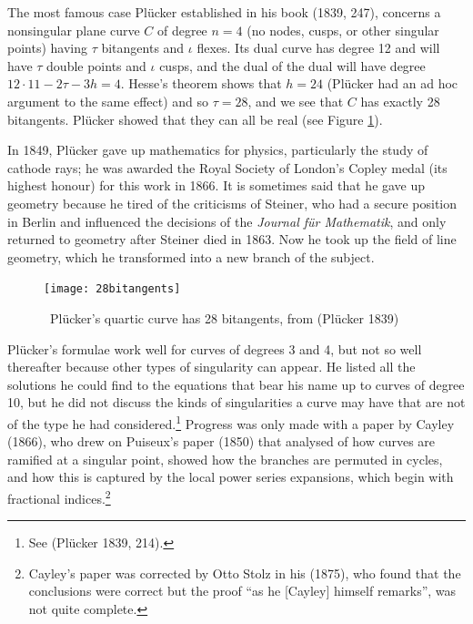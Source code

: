 The most famous case Pl\"ucker established in  his book (1839, 247),  concerns   a nonsingular plane curve $C$ of degree $n=4$  (no nodes, cusps, or other singular points) having $\tau$ bitangents and $\iota$ flexes.   Its dual curve has degree 12 and will have $\tau$ double points and $\iota$ cusps, and the dual of the dual will have degree 
$12\cdot 11 - 2\tau - 3h  = 4.$ 
Hesse's theorem shows that $h = 24$ (Pl\"ucker  had an ad hoc argument to the same effect)  and so $\tau = 28$,  and we  see that $C$ has exactly 28 bitangents. Pl\"ucker showed that they can all be real (see Figure \ref{fig28bitangents}).

In 1849, Pl\"ucker gave up mathematics for physics, particularly the study of cathode rays; he was awarded the Royal Society of London's Copley medal (its highest honour) for this work in 1866. It is sometimes said that he gave up geometry because he tired of the criticisms of Steiner, who had a secure position in Berlin and influenced the decisions of the \emph{Journal f\"ur Mathematik}, and only returned to geometry after Steiner died in 1863. Now he took up  the field of line geometry, which he transformed into a new branch of the subject. 

\bigskip

\begin{center} \label{28bitangents}
    \begin{figure}
   \begin{center}  \texttt{[image: 28bitangents]} 
   \end{center}
     \protect \caption{\, Pl\"ucker's quartic curve has 28 bitangents, from (Pl\"ucker 1839)}
      \label{fig28bitangents}
     \end{figure}
\end{center}
\bigskip

Pl\"ucker's formulae work well for curves of degrees 3 and 4,  but not so well thereafter because other types of singularity can appear.   He listed all the solutions he could find to the equations that bear his name up to curves of degree 10, but he did not discuss the kinds of singularities a curve may have that are not of the type he had considered.\footnote{See (Pl\"ucker 1839, 214).}  Progress was only made with a paper by Cayley (1866), who drew on Puiseux's paper (1850) that analysed  of how curves are ramified at a singular point,  showed how the branches are permuted in cycles, and how this is captured by the local power series expansions, which begin with fractional indices.\footnote{Cayley's paper was corrected by Otto Stolz in his (1875), who found that the conclusions were correct but the proof ``as he [Cayley] himself remarks'', was not quite complete.}

